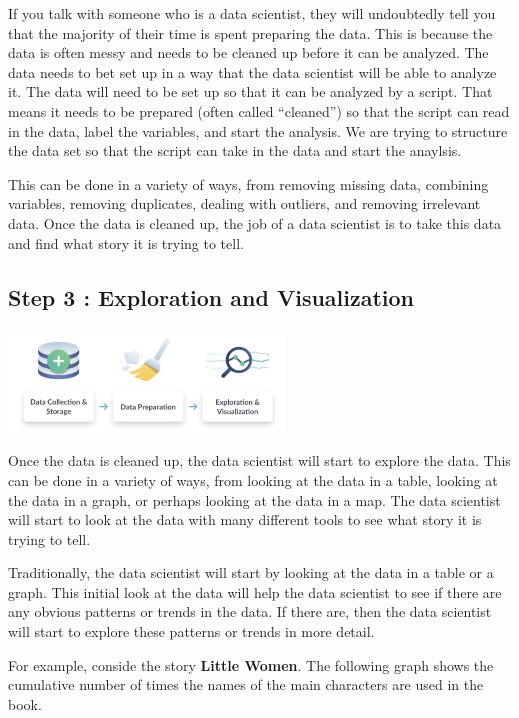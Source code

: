 \documentclass[
  letterpaper,
  DIV=11,
  numbers=noendperiod]{scrreprt}
\begin{document}
If you talk with someone who is a data scientist, they will undoubtedly
tell you that the majority of their time is spent preparing the data.
This is because the data is often messy and needs to be cleaned up
before it can be analyzed. The data needs to bet set up in a way that
the data scientist will be able to analyze it. The data will need to be
set up so that it can be analyzed by a script. That means it needs to be
prepared (often called ``cleaned'') so that the script can read in the
data, label the variables, and start the analysis. We are trying to
structure the data set so that the script can take in the data and start
the anaylsis.

This can be done in a variety of ways, from removing missing data,
combining variables, removing duplicates, dealing with outliers, and
removing irrelevant data. Once the data is cleaned up, the job of a data
scientist is to take this data and find what story it is trying to tell.

\subsection*{Step 3 : Exploration and
Visualization}\label{step-3-exploration-and-visualization}

\includegraphics[width=0.55\textwidth,height=\textheight]{./images/WIDS-5.jpg}

Once the data is cleaned up, the data scientist will start to explore
the data. This can be done in a variety of ways, from looking at the
data in a table, looking at the data in a graph, or perhaps looking at
the data in a map. The data scientist will start to look at the data
with many different tools to see what story it is trying to tell.

Traditionally, the data scientist will start by looking at the data in a
table or a graph. This initial look at the data will help the data
scientist to see if there are any obvious patterns or trends in the
data. If there are, then the data scientist will start to explore these
patterns or trends in more detail.

For example, conside the story \textbf{Little Women}. The following
graph shows the cumulative number of times the names of the main
characters are used in the book.
\end{document}
